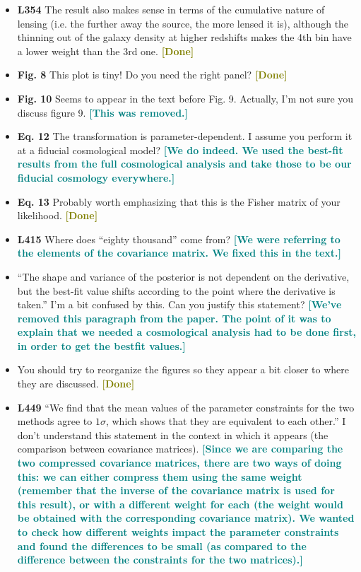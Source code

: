 \documentclass{article}
\newcommand\reply[1]{{\bf {\textcolor{teal}{[#1]}}}}
\newcommand\done{{\bf {\textcolor{olive}{[Done]}}}}
\begin{document}
\begin{itemize}
		\item \textbf{L354} The result also makes sense in terms of the cumulative nature of lensing (i.e. the further away the source, the more lensed it is), although the thinning out of the galaxy density at higher redshifts makes the 4th bin have a lower weight than the 3rd one. \done
		\item \textbf{Fig. 8} This plot is tiny! Do you need the right panel? \done
		\item \textbf{Fig. 10} Seems to appear in the text before Fig. 9. Actually, I'm not sure you discuss figure 9. \reply{This was removed.}
		\item \textbf{Eq. 12} The transformation is parameter-dependent. I assume you perform it at a fiducial cosmological model? \reply{We do indeed. We used the best-fit results from the full cosmological analysis and take those to be our fiducial cosmology everywhere.}
		\item \textbf{Eq. 13} Probably worth emphasizing that this is the Fisher matrix of your likelihood. \done
		\item \textbf{L415} Where does “eighty thousand” come from? \reply{We were referring to the elements of the covariance matrix. We fixed this in the text.}
		\item “The shape and variance of the posterior is not dependent on the derivative, but the best-fit value shifts according to the point where the derivative is taken.” I'm a bit confused by this. Can you justify this statement? \reply{We've removed this paragraph from the paper. The point of it was to explain that we needed a cosmological analysis had to be done first, in order to get the bestfit values.}
		\item You should try to reorganize the figures so they appear a bit closer to where they are discussed. \done
		\item \textbf{L449} “We find that the mean values of the parameter constraints for the two methods agree to $1 \sigma$, which shows that they are equivalent to each other.” I don't understand this statement in the context in which it appears (the comparison between covariance matrices). \reply{Since we are comparing the two compressed covariance matrices, there are two ways of doing this: we can either compress them using the same weight (remember that the inverse of the covariance matrix is used for this result), or with a different weight for each (the weight would be obtained with the corresponding covariance matrix). We wanted to check how different weights impact the parameter constraints and found the differences to be small (as compared to the difference between the constraints for the two matrices).}

\end{itemize}
\end{document}
